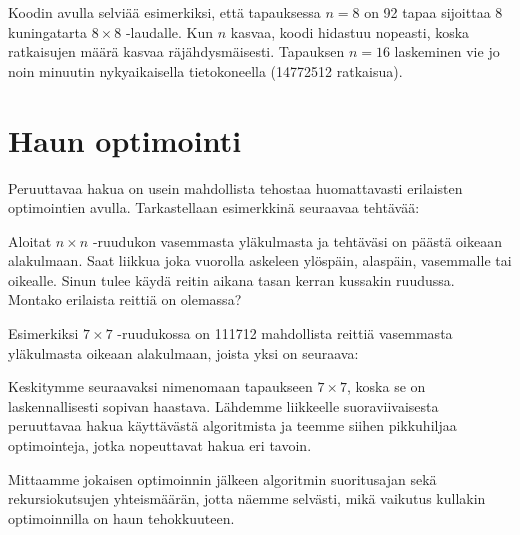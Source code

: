 Koodin avulla selviää esimerkiksi,
että tapauksessa $n=8$ on 92 tapaa sijoittaa 8
kuningatarta $8 \times 8$ -laudalle.
Kun $n$ kasvaa, koodi hidastuu nopeasti,
koska ratkaisujen määrä kasvaa räjähdysmäisesti.
Tapauksen $n=16$ laskeminen vie jo noin minuutin
nykyaikaisella tietokoneella (14772512 ratkaisua).

\section{Haun optimointi}

Peruuttavaa hakua on usein mahdollista tehostaa
huomattavasti erilaisten optimointien avulla.
Tarkastellaan esimerkkinä seuraavaa tehtävää:

\begin{task}
Aloitat $n \times n$ -ruudukon
vasemmasta yläkulmasta ja tehtäväsi on päästä
oikeaan alakulmaan.
Saat liikkua joka vuorolla askeleen
ylöspäin, alaspäin, vasemmalle tai oikealle.
Sinun tulee käydä reitin aikana tasan kerran
kussakin ruudussa.
Montako erilaista reittiä on olemassa?
\end{task}

Esimerkiksi $7 \times 7$ -ruudukossa on
111712 mahdollista reittiä vasemmasta yläkulmasta
oikeaan alakulmaan, joista yksi on seuraava:

\begin{center}
\end{center}

Keskitymme seuraavaksi nimenomaan tapaukseen $7 \times 7$,
koska se on laskennallisesti sopivan haastava.
Lähdemme liikkeelle suoraviivaisesta peruuttavaa hakua
käyttävästä algoritmista
ja teemme siihen pikkuhiljaa optimointeja,
jotka nopeuttavat hakua eri tavoin.

Mittaamme jokaisen optimoinnin jälkeen
algoritmin suoritusajan sekä rekursiokutsujen yhteismäärän,
jotta näemme selvästi, mikä vaikutus kullakin
optimoinnilla on haun tehokkuuteen.

